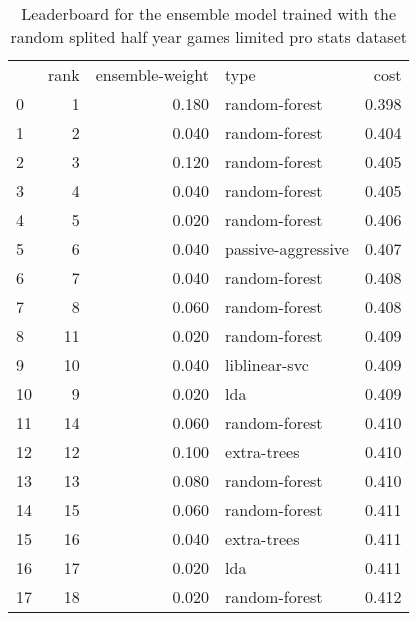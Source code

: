 \begin{table}[]
	\centering
	\begin{tabular}{lrrlr}
		   & rank & ensemble-weight & type               & cost  \\
		0  & 1    & 0.180           & random-forest      & 0.398 \\
		1  & 2    & 0.040           & random-forest      & 0.404 \\
		2  & 3    & 0.120           & random-forest      & 0.405 \\
		3  & 4    & 0.040           & random-forest      & 0.405 \\
		4  & 5    & 0.020           & random-forest      & 0.406 \\
		5  & 6    & 0.040           & passive-aggressive & 0.407 \\
		6  & 7    & 0.040           & random-forest      & 0.408 \\
		7  & 8    & 0.060           & random-forest      & 0.408 \\
		8  & 11   & 0.020           & random-forest      & 0.409 \\
		9  & 10   & 0.040           & liblinear-svc      & 0.409 \\
		10 & 9    & 0.020           & lda                & 0.409 \\
		11 & 14   & 0.060           & random-forest      & 0.410 \\
		12 & 12   & 0.100           & extra-trees        & 0.410 \\
		13 & 13   & 0.080           & random-forest      & 0.410 \\
		14 & 15   & 0.060           & random-forest      & 0.411 \\
		15 & 16   & 0.040           & extra-trees        & 0.411 \\
		16 & 17   & 0.020           & lda                & 0.411 \\
		17 & 18   & 0.020           & random-forest      & 0.412 \\
	\end{tabular}

	\caption{Leaderboard for the ensemble model trained with the random splited half year games limited pro stats dataset}
	\label{tab:lb-all-games-pro-only-small-randsplit}
\end{table}

